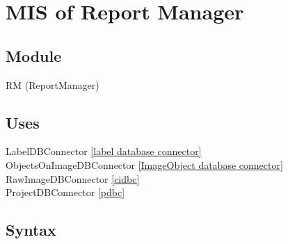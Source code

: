 \documentclass[12pt, titlepage]{article}
\begin{document}







\section{MIS of Report Manager} \label{rm} 
    \subsection{Module}
        RM (ReportManager)

    \subsection{Uses}
        LabelDBConnector \ref{label database connector}\\
        ObjectsOnImageDBConnector \ref{ImageObject database connector}\\
        RawImageDBConnector \ref{cidbc}\\
        ProjectDBConnector \ref{pdbc}

    \subsection{Syntax}
\end{document}
